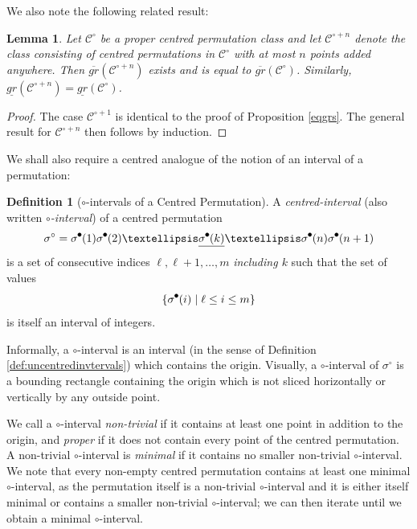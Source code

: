 \documentclass[11pt,a4paper]{article}
\newtheorem{lemma}[thm]{Lemma}
\theoremstyle{definition}
\newtheorem{defn}[thm]{Definition}
\newtheorem{comment}[thm]{Comment}
\newcommand{\tikzcircle}[2][black,fill=black]{\tikz[baseline=-0.5ex]\draw[#1,radius=#2] (0,0) circle ;}
\begin{document}

We also note the following related result:
\begin{lemma} \label{eqgrs2}
Let $\mathcal{C}^{\circ}$ be a proper centred permutation class and let $\mathcal{C}^{\circ+n}$ denote the class consisting of centred permutations in $\mathcal{C}^{\circ}$ with at most $n$ points added anywhere. Then $\overline{gr}(\mathcal{C}^{\circ+n})$ exists and is equal to $\overline{gr}(\mathcal{C}^{\circ})$. Similarly, $\underline{gr}(\mathcal{C}^{\circ+n}) = \underline{gr}(\mathcal{C}^{\circ})$.
\end{lemma}

\begin{proof}
The case $\mathcal{C}^{\circ+1}$ is identical to the proof of Proposition \ref{eqgrs}. The general result for $\mathcal{C}^{\circ+n}$ then follows by induction. \qedhere
\end{proof}

We shall also require a centred analogue of the notion of an interval of a permutation:
\begin{defn}[$\circ$-intervals of a Centred Permutation]
A \emph{centred-interval} (also written \emph{$\circ$-interval}) of a centred permutation
\[
\sigma^{\circ} = \sigma^{\tikzcircle{1.5pt}}(1)\sigma^{\tikzcircle{1.5pt}}(2)\dots\underline{\sigma^{\tikzcircle{1.5pt}}(k)}\dots\sigma^{\tikzcircle{1.5pt}}(n)\sigma^{\tikzcircle{1.5pt}}(n+1)
\]
is a set of consecutive indices $\ell, \ell+1, \dots , m$ \emph{including $k$} such that the set of values
\[
\{\sigma^{\tikzcircle{1.5pt}}(i) \mid \ell \leq i \leq m\}
\]
is itself an interval of integers.

Informally, a $\circ$-interval is an interval (in the sense of Definition \ref{def:uncentredinvtervals}) which contains the origin. Visually, a $\circ$-interval of $\sigma^{\circ}$ is a bounding rectangle containing the origin which is not sliced horizontally or vertically by any outside point.

We call a $\circ$-interval \emph{non-trivial} if it contains at least one point in addition to the origin, and \emph{proper} if it does not contain every point of the centred permutation. A non-trivial $\circ$-interval is \emph{minimal} if it contains no smaller non-trivial $\circ$-interval. We note that every non-empty centred permutation contains at least one minimal $\circ$-interval, as the permutation itself is a non-trivial $\circ$-interval and it is either itself minimal or contains a smaller non-trivial $\circ$-interval; we can then iterate until we obtain a minimal $\circ$-interval.
\end{defn}
\end{document}
